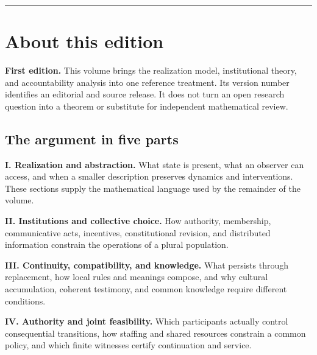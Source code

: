\documentclass[11pt,letterpaper]{article}
\theoremstyle{plain}
\theoremstyle{definition}
\theoremstyle{remark}
\begin{document}
\begin{titlepage}
\vfill
\noindent\rule{\textwidth}{.4pt}\par\smallskip
{}
\end{titlepage}
\hypersetup{pageanchor=true}
\begingroup\small\setlength{\parskip}{0pt}\tableofcontents\endgroup\clearpage

\section*{About this edition}

\noindent\textbf{First edition.} This volume brings the realization model, institutional theory, and accountability analysis into one reference treatment. Its version number identifies an editorial and source release. It does not turn an open research question into a theorem or substitute for independent mathematical review.

\subsection*{The argument in five parts}

\noindent\textbf{I. Realization and abstraction.} What state is present, what an observer can access, and when a smaller description preserves dynamics and interventions. These sections supply the mathematical language used by the remainder of the volume.

\noindent\textbf{II. Institutions and collective choice.} How authority, membership, communicative acts, incentives, constitutional revision, and distributed information constrain the operations of a plural population.

\noindent\textbf{III. Continuity, compatibility, and knowledge.} What persists through replacement, how local rules and meanings compose, and why cultural accumulation, coherent testimony, and common knowledge require different conditions.

\noindent\textbf{IV. Authority and joint feasibility.} Which participants actually control consequential transitions, how staffing and shared resources constrain a common policy, and which finite witnesses certify continuation and service.
\end{document}
